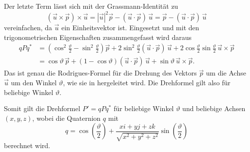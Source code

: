 Der letzte Term lässt sich mit der Grassmann-Identität zu
\begin{equation*}
    (\vec{u}\times\vec{p})\times\vec{u}
    = |\vec{u}|^2\vec{p} - (\vec{u}\cdot\vec{p})\,\vec{u}
    = \vec{p} - (\vec{u}\cdot\vec{p})\,\vec{u}
\end{equation*}
vereinfachen, da $\vec{u}$ ein Einheitsvektor ist. Eingesetzt und mit den
trigonometrischen Eigenschaften zusammengefasst wird daraus
\begin{align*}
    qPq^{*}
    &= \left(\cos^2\frac{\vartheta}{2} - \sin^2\frac{\vartheta}{2}\right)\vec{p}
    + 2\sin^2\frac{\vartheta}{2}(\vec{u}\cdot\vec{p})\,\vec{u}
    + 2\cos\frac{\vartheta}{2}\sin\frac{\vartheta}{2}\,\vec{u}\times\vec{p} \\
    &= \cos\vartheta\,\vec{p}
    + (1 - \cos\vartheta)(\vec{u}\cdot\vec{p})\,\vec{u}
    + \sin\vartheta\,\vec{u}\times\vec{p}.
\end{align*}
Das ist genau die Rodrigues-Formel für die Drehung des Vektors $\vec{p}$ um
%
die Achse $\vec{u}$ um den Winkel $\vartheta$, wie sie in
\cite[pp.~459--460]{qa:linalg} hergeleitet wird. Die Drehformel gilt also für beliebige
Winkel $\vartheta$.

Somit gilt die Drehformel $P' = qPq^{*}$ für beliebige Winkel $\vartheta$ und beliebige Achsen $(x,y,z)$,
wobei die Quaternion $q$ mit
\begin{equation*}
    q = \cos\left(\frac{\vartheta}{2}\right) 
    + \frac{xi + yj + zk}{\sqrt{x^2 + y^2 + z^2}}
    \sin\left(\frac{\vartheta}{2}\right)
\end{equation*}
berechnet wird.
